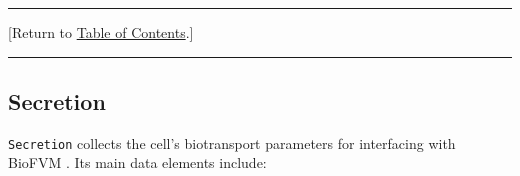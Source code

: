 \documentclass[12pt]{article}
\renewcommand{\vec}[1]{\mathbf{#1}}
\newcommand{\beq}{\begin{equation}}
\newcommand{\eeq}{\end{equation}}
\renewcommand{\v}{\verb}
\newcommand{\blue}[1]{\textcolor{blue}{#1}}
\newcommand{\DONE}{}%
\newcommand{\TOClink}{\begin{center}\hrule\vskip-5pt\phantom{.}\hfill[Return to \hyperlink{TOC}{Table of Contents}.]\hfill\phantom{.}\vskip3pt\hrule\end{center}}
\begin{document}
\TOClink

\subsection{Secretion \DONE}
\label{sec:Secretion}
\v|Secretion| collects the cell's biotransport parameters for interfacing with BioFVM \cite{ref:BioFVM}. Its main data elements include:
\end{document}
